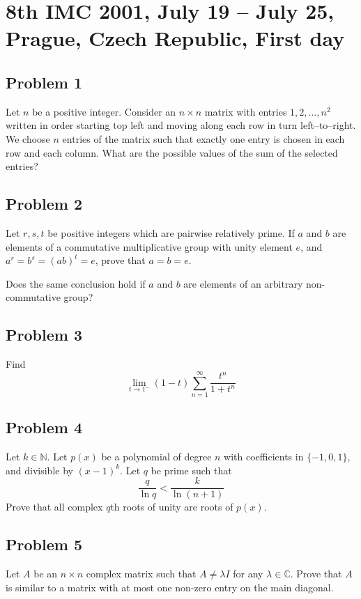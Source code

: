\documentclass{article}
\begin{document}
\pagestyle{plain}

\section*{8th IMC 2001, July 19 -- July 25, Prague, Czech Republic, First day}

\subsection*{Problem 1}
Let \( n \) be a positive integer. Consider an \( n \times n \) matrix with entries \( 1, 2, \ldots, n^2 \) written in order starting top left and moving along each row in turn left–to–right. We choose \( n \) entries of the matrix such that exactly one entry is chosen in each row and each column. What are the possible values of the sum of the selected entries?

\subsection*{Problem 2}
Let \( r, s, t \) be positive integers which are pairwise relatively prime. If \( a \) and \( b \) are elements of a commutative multiplicative group with unity element \( e \), and \( a^r = b^s = (ab)^t = e \), prove that \( a = b = e \).

Does the same conclusion hold if \( a \) and \( b \) are elements of an arbitrary non-commutative group?

\subsection*{Problem 3}
Find
\[
\lim_{t \to 1^-} (1 - t) \sum_{n=1}^{\infty} \frac{t^n}{1 + t^n}
\]

\subsection*{Problem 4}
Let \( k \in \mathbb{N} \). Let \( p(x) \) be a polynomial of degree \( n \) with coefficients in \( \{-1, 0, 1\} \), and divisible by \( (x - 1)^k \). Let \( q \) be prime such that
\[
\frac{q}{\ln q} < \frac{k}{\ln(n+1)}
\]
Prove that all complex \( q \)th roots of unity are roots of \( p(x) \).

\subsection*{Problem 5}
Let \( A \) be an \( n \times n \) complex matrix such that \( A \ne \lambda I \) for any \( \lambda \in \mathbb{C} \). Prove that \( A \) is similar to a matrix with at most one non-zero entry on the main diagonal.
\end{document}

